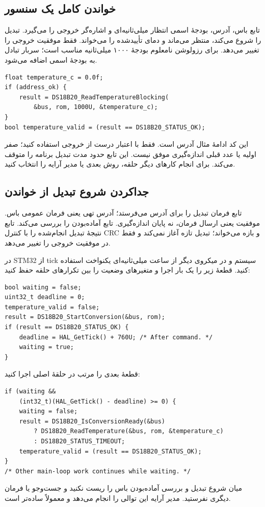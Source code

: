 \subsection{خواندن کامل یک سنسور}
تابع
باس، آدرس، بودجهٔ اسمی انتظار میلی‌ثانیه‌ای و اشاره‌گر خروجی را می‌گیرد. تبدیل
را شروع می‌کند، منتظر می‌ماند و دمای تأییدشده را می‌خواند. فقط موفقیت خروجی را
تغییر می‌دهد. برای رزولوشن نامعلوم بودجهٔ ۱۰۰۰ میلی‌ثانیه مناسب است؛ سربار تبادل
به بودجهٔ اسمی اضافه می‌شود.
\begin{LTR}
\begin{lstlisting}
float temperature_c = 0.0f;
if (address_ok) {
    result = DS18B20_ReadTemperatureBlocking(
        &bus, rom, 1000U, &temperature_c);
}
bool temperature_valid = (result == DS18B20_STATUS_OK);
\end{lstlisting}
\end{LTR}
این کد ادامهٔ مثال آدرس است. فقط با اعتبار درست از خروجی استفاده کنید؛ صفر
اولیه یا عدد قبلی اندازه‌گیری موفق نیست. این تابع حدود مدت تبدیل برنامه را
متوقف می‌کند. برای انجام کارهای دیگر حلقه، روش بعدی یا مدیر آرایه را انتخاب کنید.

\subsection{جداکردن شروع تبدیل از خواندن}
تابع
فرمان تبدیل را برای آدرس می‌فرستد؛ آدرس تهی یعنی فرمان عمومی باس. موفقیت یعنی
ارسال فرمان، نه پایان اندازه‌گیری. تابع
آماده‌بودن را بررسی می‌کند. تابع
نتیجهٔ تبدیل انجام‌شده را با کنترل CRC و بازه می‌خواند؛ تبدیل تازه آغاز نمی‌کند
و فقط در موفقیت خروجی را تغییر می‌دهد.

در STM32 از tick سیستم و در میکروی دیگر از ساعت میلی‌ثانیه‌ای یکنواخت استفاده
کنید. قطعهٔ زیر را یک بار اجرا و متغیرهای وضعیت را بین تکرارهای حلقه حفظ کنید:
\begin{LTR}
\begin{lstlisting}
bool waiting = false;
uint32_t deadline = 0;
temperature_valid = false;
result = DS18B20_StartConversion(&bus, rom);
if (result == DS18B20_STATUS_OK) {
    deadline = HAL_GetTick() + 760U; /* After command. */
    waiting = true;
}
\end{lstlisting}
\end{LTR}
قطعهٔ بعدی را مرتب در حلقهٔ اصلی اجرا کنید:
\begin{LTR}
\begin{lstlisting}
if (waiting &&
    (int32_t)(HAL_GetTick() - deadline) >= 0) {
    waiting = false;
    result = DS18B20_IsConversionReady(&bus)
        ? DS18B20_ReadTemperature(&bus, rom, &temperature_c)
        : DS18B20_STATUS_TIMEOUT;
    temperature_valid = (result == DS18B20_STATUS_OK);
}
/* Other main-loop work continues while waiting. */
\end{lstlisting}
\end{LTR}
میان شروع تبدیل و بررسی آماده‌بودن باس را ریست نکنید و جست‌وجو یا فرمان دیگری
نفرستید. مدیر آرایه این توالی را انجام می‌دهد و معمولاً ساده‌تر است.

